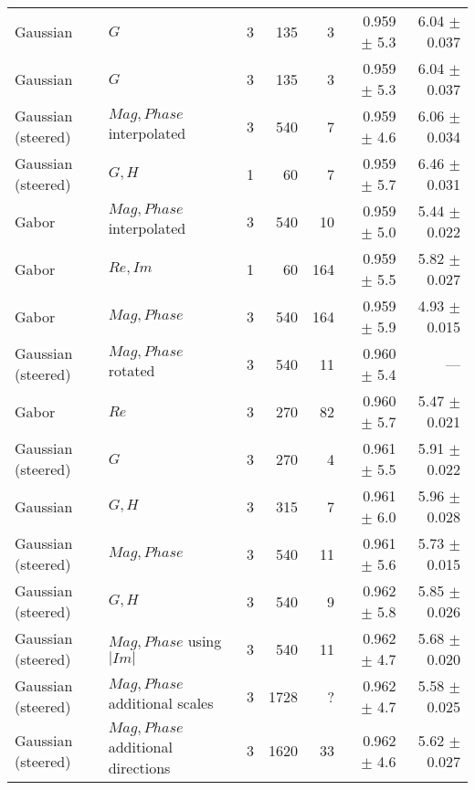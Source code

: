 \begin{tabularx}{\linewidth}{p{3cm} p{3cm} r r r r r}
Gaussian& $G$                       & 3 &    135    &  3     & 0.959 $\pm$ 5.3 & 6.04 $\pm$ 0.037 \\

Gaussian& $G$                       & 3 &    135    &  3     & 0.959 $\pm$ 5.3 & 6.04 $\pm$ 0.037 \\

Gaussian (steered)& $Mag, Phase$ interpolated
                                    & 3 &    540    &  7     & 0.959 $\pm$ 4.6     & 6.06 $\pm$ 0.034 \\

Gaussian (steered)& $G,H$           & 1 &     60    &  7     & 0.959 $\pm$ 5.7   & 6.46 $\pm$ 0.031 \\

Gabor   & $Mag, Phase$ interpolated & 3 &    540    & 10     & 0.959 $\pm$ 5.0     & 5.44 $\pm$ 0.022 \\

Gabor   & $Re,Im$                   & 1 &     60    &164     & 0.959 $\pm$ 5.5   & 5.82 $\pm$ 0.027 \\

Gabor   & $Mag,Phase$               & 3 &    540    &164     & 0.959 $\pm$ 5.9     & 4.93 $\pm$  0.015 \\

Gaussian (steered)& $Mag,Phase$ rotated
                                    & 3 &    540    & 11     & 0.960 $\pm$ 5.4     & --- \\

Gabor   & $Re$                      & 3 &    270    & 82     & 0.960 $\pm$ 5.7   & 5.47 $\pm$ 0.021 \\

Gaussian (steered)& $G$             & 3 &    270    &  4     & 0.961 $\pm$ 5.5   & 5.91 $\pm$ 0.022 \\

Gaussian& $G, H$                    & 3 &    315    &  7     & 0.961 $\pm$ 6.0 & 5.96 $\pm$ 0.028 \\

Gaussian (steered)& $Mag, Phase$    & 3 &    540    & 11     & 0.961 $\pm$ 5.6     & 5.73 $\pm$ 0.015 \\

Gaussian (steered)& $G,H$           & 3 &    540    &  9     & 0.962 $\pm$ 5.8   & 5.85 $\pm$ 0.026 \\

Gaussian (steered)& $Mag,Phase$ using $|Im|$       
                                    & 3 &    540    & 11     & 0.962 $\pm$ 4.7     & 5.68 $\pm$ 0.020 \\
Gaussian (steered)& $Mag,Phase$ additional scales  
                                    & 3 &   1728    &  ?     & 0.962 $\pm$ 4.7     & 5.58 $\pm$ 0.025 \\
Gaussian (steered)& $Mag,Phase$ additional directions
                                    & 3 &   1620    & 33     & 0.962 $\pm$ 4.6     & 5.62 $\pm$ 0.027 \\


\end{tabularx}
